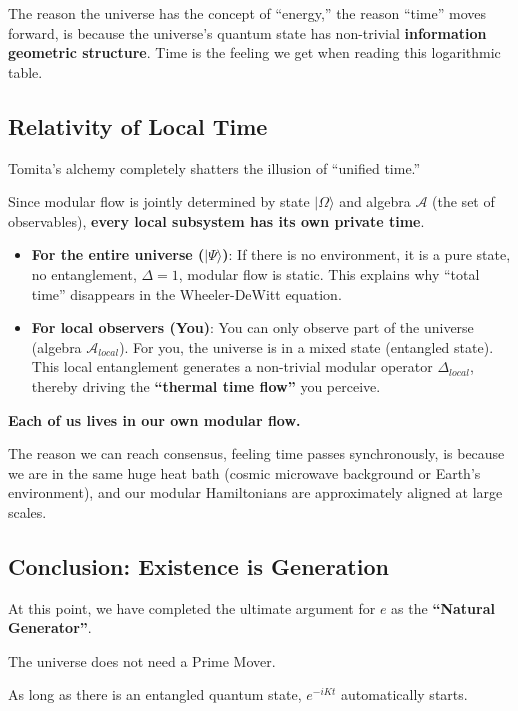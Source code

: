 The reason the universe has the concept of ``energy,'' the reason ``time'' moves forward, is because the universe's quantum state has non-trivial \textbf{information geometric structure}. Time is the feeling we get when reading this logarithmic table.

\subsection{Relativity of Local Time}

Tomita's alchemy completely shatters the illusion of ``unified time.''

Since modular flow is jointly determined by state $|\Omega\rangle$ and algebra $\mathcal{A}$ (the set of observables), \textbf{every local subsystem has its own private time}.

\begin{itemize}
\item \textbf{For the entire universe ($|\Psi\rangle$)}: If there is no environment, it is a pure state, no entanglement, $\Delta = 1$, modular flow is static. This explains why ``total time'' disappears in the Wheeler-DeWitt equation.

\item \textbf{For local observers (You)}: You can only observe part of the universe (algebra $\mathcal{A}_{local}$). For you, the universe is in a mixed state (entangled state). This local entanglement generates a non-trivial modular operator $\Delta_{local}$, thereby driving the \textbf{``thermal time flow''} you perceive.
\end{itemize}

\textbf{Each of us lives in our own modular flow.}

The reason we can reach consensus, feeling time passes synchronously, is because we are in the same huge heat bath (cosmic microwave background or Earth's environment), and our modular Hamiltonians are approximately aligned at large scales.

\subsection{Conclusion: Existence is Generation}

At this point, we have completed the ultimate argument for \textbf{$e$} as the \textbf{``Natural Generator''}.

The universe does not need a Prime Mover.

As long as there is an entangled quantum state, \textbf{$e^{-iKt}$} automatically starts.

